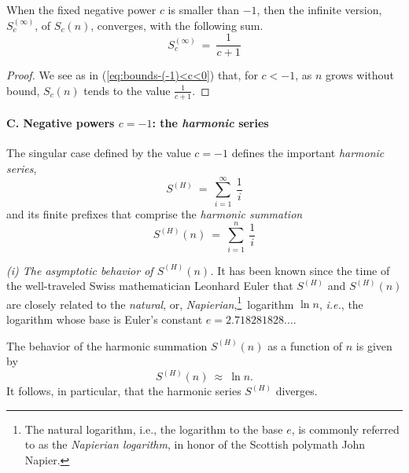 \begin{prop}
\label{thm:bounds-negative-(not-1)-sum-xc}
When the fixed negative power $c$ is smaller than $-1$, then the
infinite version, $S_c^{(\infty)}$, of $S_c(n)$, converges, with the
following sum.
\begin{equation}
\label{eq:bounds-negative-(not-1)-sum-xc}
S_c^{(\infty)} \ = \ \frac{1}{c+1}
\end{equation}
\end{prop}

\begin{proof}
We see as in (\ref{eq:bounds-(-1)<c<0}) that, for $c<-1$, as $n$ grows
without bound, $S_c(n)$ tends to the value ${\displaystyle
  \frac{1}{c+1}}$.
\end{proof}

\paragraph{C. Negative powers $c = -1$: the {\em harmonic} series}

The singular case defined by the value $c = -1$ defines the important
{\it harmonic series},
\[ S^{(H)} \ = \ \sum_{i=1}^\infty \ \frac{1}{i} \]
and its finite prefixes that comprise the {\it harmonic summation}
\[ S^{(H)}(n) \ = \ \sum_{i=1}^n \ \frac{1}{i} \]


{\it (i) The asymptotic behavior of $S^{(H)}(n)$.}
%
It has been known since the time of the well-traveled Swiss
mathematician Leonhard Euler  that $S^{(H)}$
and $S^{(H)}(n)$ are closely related to the {\em natural}, or,
{\it Napierian},\footnote{The natural logarithm, i.e., the logarithm
  to the base $e$, is commonly referred to as the {\it Napierian
    logarithm}, in honor of the Scottish polymath John
  Napier.}~logarithm $\ln n$, \textit{i.e.}, the logarithm whose base is
Euler's constant  $e = 2.718281828 \ldots$.

\begin{prop}
\label{thm:harmonic}
The behavior of the harmonic summation $S^{(H)}(n)$ as a function of
$n$ is given by
\[ S^{(H)}(n) \ \approx \ \ln n. \]
It follows, in particular, that the harmonic series $S^{(H)}$ diverges.
\end{prop}
\medskip

\noindent {}

